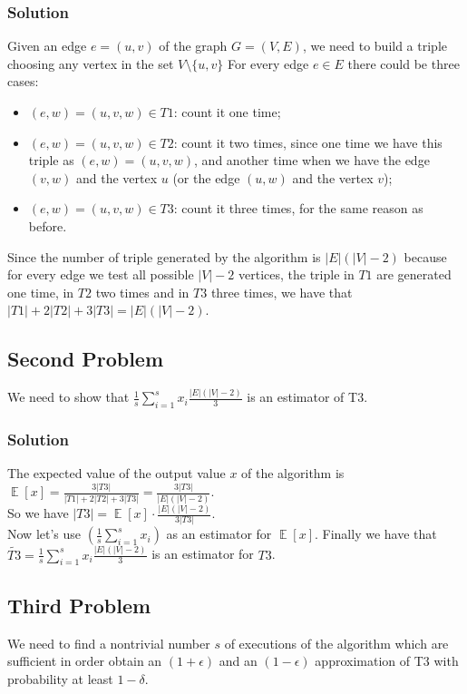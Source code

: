 \documentclass[11pt]{article}
\begin{document}
\subsubsection*{Solution}
Given an edge $e = (u, v)$ of the graph $G = (V, E)$, we need to build a triple choosing any vertex in the set $V \setminus \{u, v\}$
For every edge $e \in E$ there could be three cases:
\begin{itemize}
	\item $(e, w) = (u, v, w) \in T1$: count it one time;
	\item $(e, w) = (u, v, w) \in T2$: count it two times, since one time we have this triple as $(e, w) = (u, v, w)$, and another time when we have the edge $(v, w)$ and the vertex $u$ (or the edge $(u, w)$ and the vertex $v$);
	\item $(e, w) = (u, v, w) \in T3$: count it three times, for the same reason as before.
\end{itemize}
Since the number of triple generated by the algorithm is $|E|(|V|-2)$ because for every edge we test all possible $|V| - 2$ vertices, the triple in $T1$ are generated one time, in $T2$ two times and in $T3$ three times, we have that $|T1| + 2|T2| + 3|T3| = |E|(|V | − 2)$.

\subsection*{Second Problem}
We need to show that $\frac{1}{s}\sum\limits_{i = 1}^s x_i\frac{|E|(|V|-2)}{3}$ is an estimator of T3.
\subsubsection*{Solution}
The expected value of the output value $x$ of the algorithm is $\mathop{\mathbb{E}}[x] = \frac{3|T3|}{|T1| + 2|T2| + 3|T3|} = \frac{3|T3|}{|E|(|V| - 2)}$. \\
So we have $|T3| = \mathop{\mathbb{E}}[x] \cdot \frac{|E|(|V| - 2)}{3|T3|}$. \\
Now let's use $(\frac{1}{s}\sum\limits_{i = 1}^s x_i)$ as an estimator for $\mathop{\mathbb{E}}[x]$.
Finally we have that $\tilde{T3} = \frac{1}{s}\sum\limits_{i = 1}^s x_i\frac{|E|(|V|-2)}{3}$ is an estimator for $T3$.

\subsection*{Third Problem}
We need to find a nontrivial number $s$ of executions of the algorithm which are sufficient in order
obtain an $(1 + \epsilon)$ and an $(1 - \epsilon)$ approximation of T3 with probability at least $1 - \delta$.
\end{document}
